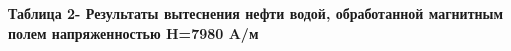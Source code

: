 
{\bfseries Таблица 2- Результаты вытеснения нефти водой, обработанной
магнитным полем напряженностью H=7980 A/м}

